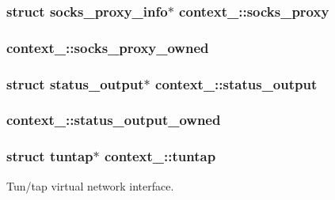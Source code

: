 \subsubsection[{socks\+\_\+proxy}]{\setlength{\rightskip}{0pt plus 5cm}struct {\bf socks\+\_\+proxy\+\_\+info}$\ast$ context\+\_\+::socks\+\_\+proxy}\label{structcontext__1_af266db9e924917e0dab9ca0f01259df1}
\hypertarget{structcontext__1_aaac4b2b8b2b667ffe53c32dcfb137144}{}
\subsubsection[{socks\+\_\+proxy\+\_\+owned}]{ context\+\_\+::socks\+\_\+proxy\+\_\+owned}\label{structcontext__1_aaac4b2b8b2b667ffe53c32dcfb137144}
\hypertarget{structcontext__1_a52e54589393f891c6eb5aa5c55de22b1}{}
\subsubsection[{status\+\_\+output}]{\setlength{\rightskip}{0pt plus 5cm}struct {\bf status\+\_\+output}$\ast$ context\+\_\+::status\+\_\+output}\label{structcontext__1_a52e54589393f891c6eb5aa5c55de22b1}
\hypertarget{structcontext__1_a8eb1f3e8ba4ab0d8167a7d232dcff498}{}
\subsubsection[{status\+\_\+output\+\_\+owned}]{ context\+\_\+::status\+\_\+output\+\_\+owned}\label{structcontext__1_a8eb1f3e8ba4ab0d8167a7d232dcff498}
\hypertarget{structcontext__1_afa52b84db5bb4e12deeabf2e788f7349}{}
\subsubsection[{tuntap}]{\setlength{\rightskip}{0pt plus 5cm}struct {\bf tuntap}$\ast$ context\+\_\+::tuntap}\label{structcontext__1_afa52b84db5bb4e12deeabf2e788f7349}
Tun/tap virtual network interface. \hypertarget{structcontext__1_acae58a5af5e0f65b4963b44c6e9715e5}{}
